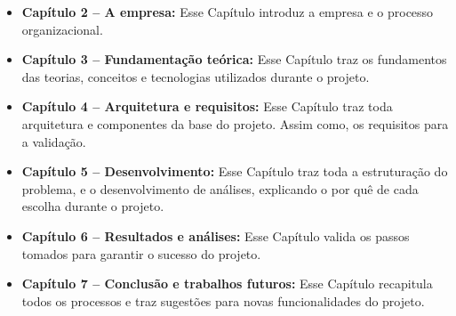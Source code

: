 \begin{itemize}
    \item \textbf{Capítulo 2 -- A empresa:} Esse Capítulo introduz a empresa e o processo organizacional.
    \item \textbf{Capítulo 3 -- Fundamentação teórica:} Esse Capítulo traz os fundamentos das teorias, conceitos e tecnologias utilizados durante o projeto.
    \item \textbf{Capítulo 4 -- Arquitetura e requisitos:} Esse Capítulo traz toda arquitetura e componentes da base do projeto. Assim como, os requisitos para a validação.
    \item \textbf{Capítulo 5 -- Desenvolvimento:} Esse Capítulo traz toda a estruturação do problema, e o desenvolvimento de análises, explicando o por quê de cada escolha durante o projeto.
    \item \textbf{Capítulo 6 -- Resultados e análises:} Esse Capítulo valida os passos tomados para garantir o sucesso do projeto. 
    \item \textbf{Capítulo 7 -- Conclusão e trabalhos futuros:} Esse Capítulo recapitula todos os processos e traz sugestões para novas funcionalidades do projeto.
\end{itemize}
